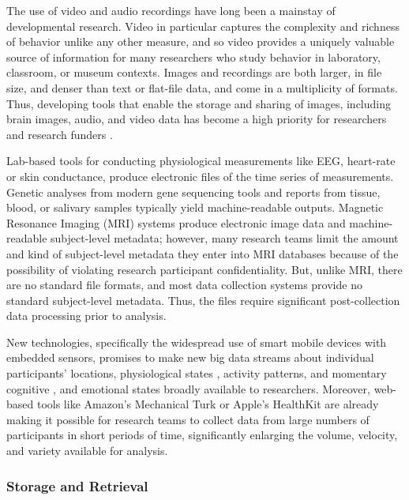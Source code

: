 \documentclass[letterpaper,man,apacite]{apa6}
\begin{document}
The use of video and audio \cite{Mehl} recordings have long been a mainstay of developmental research.
Video in particular captures the complexity and richness of behavior unlike any other measure, and so video provides a uniquely valuable source of information for many researchers who study behavior in laboratory, classroom, or museum contexts. 
Images and recordings are both larger, in file size, and denser than text or flat-file data, and come in a multiplicity of formats. 
Thus, developing tools that enable the storage and sharing of images, including brain images, audio, and video data has become a high priority for researchers and research funders \cite{Databrary2015, openfmri.org}. 

Lab-based tools for conducting physiological measurements like EEG, heart-rate or skin conductance, produce electronic files of the time series of measurements.
Genetic analyses from modern gene sequencing tools and reports from tissue, blood, or salivary samples typically yield machine-readable outputs.
Magnetic Resonance Imaging (MRI) systems produce electronic image data and machine-readable subject-level metadata; however, many research teams limit the amount and kind of subject-level metadata they enter into MRI databases because of the possibility of violating research participant confidentiality.
But, unlike MRI, there are no standard file formats, and most data collection systems provide no standard subject-level metadata.
Thus, the files require significant post-collection data processing prior to analysis. 

New technologies, specifically the widespread use of smart mobile devices with embedded sensors, promises to make new big data streams about individual participants' locations, physiological states \cite{Empatica}, activity patterns, and momentary cognitive \cite{Sliwinski}, and emotional states broadly available to researchers.
Moreover, web-based tools like Amazon's Mechanical Turk \cite{MTurk} or Apple's HealthKit \cite{HealthKit} are already making it possible for research teams to collect data from large numbers of participants in short periods of time, significantly enlarging the volume, velocity, and variety available for analysis.   

\subsubsection{Storage and Retrieval}
\end{document}
